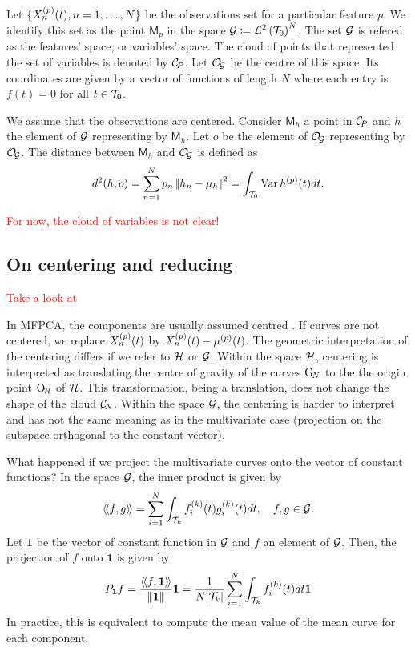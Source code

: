 Let $\{X_n^{(p)}(t), n = 1, \dots, N\}$ be the observations set for a particular feature $p$. We identify this set as the point $\mathsf{M}_p$ in the space $\mathcal{G} \coloneqq \mathcal{L}^{2}\left(\mathcal{T}_{0}\right)^N$. The set $\mathcal{G}$ is refered as the features' space, or variables' space. The cloud of points that represented the set of variables is denoted by $\mathcal{C}_{\!P}$. Let $\mathcal{O}_{\!\mathcal{G}}$ be the centre of this space. Its coordinates are given by a vector of functions of length $N$ where each entry is $f(t) = 0$ for all $t \in \mathcal{T}_{0}$.

We assume that the observations are centered. Consider $\mathsf{M}_h$ a point in $\mathcal{C}_{\!P}$ and $h$ the element of $\mathcal{G}$ representing by $\mathsf{M}_h$. Let $o$ be the element of $\mathcal{O}_{\!\mathcal{G}}$ representing by $\mathcal{O}_{\!\mathcal{G}}$. The distance between $\mathsf{M}_h$ and $\mathcal{O}_{\!\mathcal{G}}$ is defined as
\begin{equation*}
d^2(h, o) = \sum_{n = 1}^N p_n \left|\!\left|h_n - \mu_h\right|\!\right|^2 = \int_{\mathcal{T}_{0}} \operatorname{Var} h^{(p)}(t)dt.
\end{equation*} 

\textcolor{red}{For now, the cloud of variables is not clear!}


\subsection{On centering and reducing} %
\label{sub:on_centering_and_reducing}

\textcolor{red}{Take a look at \cite{protheroNewPerspectivesCentering2021}}

In MFPCA, the components are usually assumed centred \cite{happMultivariateFunctionalPrincipal2015}. If curves are not centered, we replace $X_n^{(p)}(t)$ by $X_n^{(p)}(t) - \mu^{(p)}(t)$. The geometric interpretation of the centering differs if we refer to $\mathcal{H}$ or $\mathcal{G}$. Within the space $\mathcal{H}$, centering is interpreted as translating the centre of gravity of the curves $\mathrm{G}_{\!N}$ to the the origin point $\mathrm{O}_{\!\mathcal{H}}$ of $\mathcal{H}$. This transformation, being a translation, does not change the shape of the cloud $\mathcal{C}_{\!N}$. Within the space $\mathcal{G}$, the centering is harder to interpret and has not the same meaning as in the multivariate case (projection on the subspace orthogonal to the constant vector). 

\begin{remark}
What happened if we project the multivariate curves onto the vector of constant functions?
In the space $\mathcal{G}$, the inner product is given by
\begin{equation}
\langle\!\langle f, g\rangle\!\rangle = \sum_{i = 1}^N \int_{\mathcal{T}_{k}} f^{(k)}_i(t)g^{(k)}_i(t)dt, \quad f, g \in \mathcal{G}.
\end{equation} 
Let $\mathbf{1}$ be the vector of constant function in $\mathcal{G}$ and $f$ an element of $\mathcal{G}$. Then, the projection of $f$ onto $\mathbf{1}$ is given by
\begin{equation}
P_{\mathbf{1}}f = \frac{\langle\!\langle f, \mathbf{1}\rangle\!\rangle}{\left|\!\left|\!\left|\mathbf{1}\right|\!\right|\!\right|}\mathbf{1} = \frac{1}{N\lvert \mathcal{T}_{k} \rvert}\sum_{i = 1}^N \int_{\mathcal{T}_{k}} f^{(k)}_i(t)dt\mathbf{1}
\end{equation}
In practice, this is equivalent to compute the mean value of the mean curve for each component.
\end{remark}

